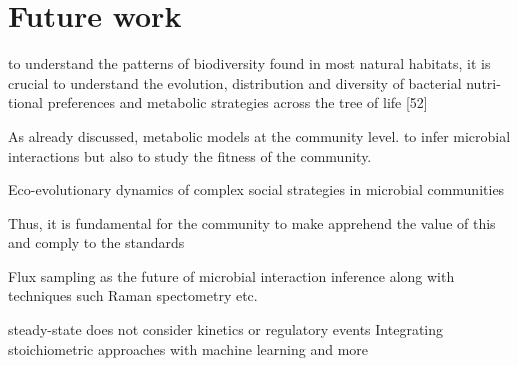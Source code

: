 \section{Future work}
\label{chap:fut-work}


   to understand the patterns of biodiversity
   found in most natural habitats, it is crucial to understand
   the evolution, distribution and diversity of bacterial nutri-
   tional preferences and metabolic strategies across the tree
   of life [52]    \citep{bajic2020ecology}



   As already discussed, metabolic models 
   at the community level. 
   to infer microbial interactions but also to study the fitness of the community. 


   Eco-evolutionary dynamics of complex social strategies in microbial communities~\citep{harrington2014eco}








Thus, it is fundamental for the community to make apprehend the value of 
this and comply to the standards~\citep{}




Flux sampling as the future of microbial interaction inference 
along with techniques such Raman spectometry etc.


steady-state does not consider kinetics or regulatory events
Integrating stoichiometric approaches with machine learning and more~\citep{sahu2021advances}